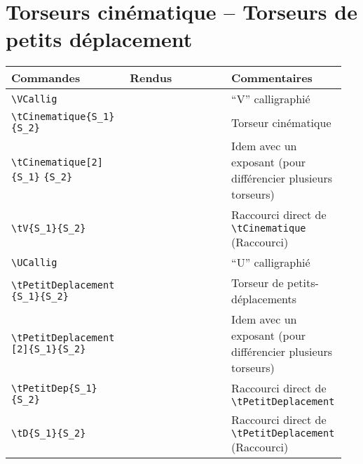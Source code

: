 \documentclass[a4paper,10pt]{article}
\newcommand{\rac}{({\color{red}Raccourci})}
\begin{document}
	\section{Torseurs cinématique -- Torseurs de petits déplacement}
	\noindent
	\begin{tabular}{|p{0.35\linewidth}|p{0.3\linewidth}|p{0.3\linewidth}|}
		\hline
			\textbf{Commandes}&\textbf{Rendus}&\textbf{Commentaires}
		\\\hline\hline
			\verb!\VCallig!		&	\VCallig	&	``V'' calligraphié
		\\\hline
			\verb!\tCinematique{S_1}! \verb!{S_2}!		&	\tCinematique{S_1}{S_2}	& Torseur cinématique	
		\\\hline
			\verb!\tCinematique[2]{S_1}! \verb!{S_2}!	&	\tCinematique[2]{S_1}{S_2}	&	Idem avec un exposant (pour différencier plusieurs torseurs)
		\\\hline
			\verb!\tV{S_1}{S_2}!		&	\tV{S_1}{S_2}	&	Raccourci direct de \verb!\tCinematique! \rac
		\\\hline
			\verb!\UCallig!		&	\UCallig	&	``U'' calligraphié
		\\\hline
			\verb!\tPetitDeplacement! \verb!{S_1}{S_2}!	&\tPetitDeplacement{S_1}{S_2}	&	Torseur de petits-déplacements	
		\\\hline
			\verb!\tPetitDeplacement! \verb![2]{S_1}{S_2}!		&	\tPetitDeplacement[2]{S_1}{S_2}	&	Idem avec un exposant (pour différencier plusieurs torseurs)
		\\\hline
			\verb!\tPetitDep{S_1}{S_2}!		&	\tPetitDep{S_1}{S_2}	&	Raccourci direct de \verb!\tPetitDeplacement!
		\\\hline
			\verb!\tD{S_1}{S_2}!		&	\tD{S_1}{S_2}	&	Raccourci direct de \verb!\tPetitDeplacement! \rac
		\\\hline
	\end{tabular}
\end{document}
